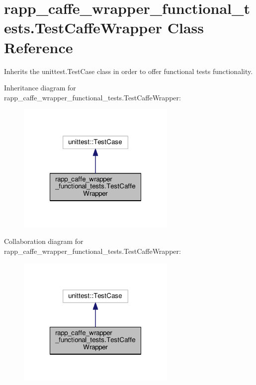 \hypertarget{classrapp__caffe__wrapper__functional__tests_1_1TestCaffeWrapper}{\section{rapp\-\_\-caffe\-\_\-wrapper\-\_\-functional\-\_\-tests.\-Test\-Caffe\-Wrapper Class Reference}
\label{classrapp__caffe__wrapper__functional__tests_1_1TestCaffeWrapper}
}


Inherits the unittest.\-Test\-Case class in order to offer functional tests functionality.  




Inheritance diagram for rapp\-\_\-caffe\-\_\-wrapper\-\_\-functional\-\_\-tests.\-Test\-Caffe\-Wrapper\-:
\nopagebreak
\begin{figure}[H]
\begin{center}
\leavevmode
\includegraphics[width=216pt]{classrapp__caffe__wrapper__functional__tests_1_1TestCaffeWrapper__inherit__graph}
\end{center}
\end{figure}


Collaboration diagram for rapp\-\_\-caffe\-\_\-wrapper\-\_\-functional\-\_\-tests.\-Test\-Caffe\-Wrapper\-:
\nopagebreak
\begin{figure}[H]
\begin{center}
\leavevmode
\includegraphics[width=216pt]{classrapp__caffe__wrapper__functional__tests_1_1TestCaffeWrapper__coll__graph}
\end{center}
\end{figure}
